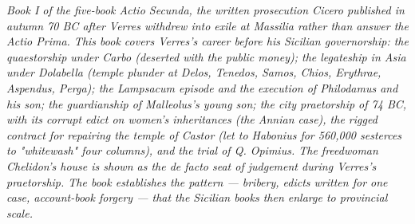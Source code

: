 
\textit{Book I of the five-book Actio Secunda, the written prosecution
Cicero published in autumn 70 BC after Verres withdrew into exile at
Massilia rather than answer the Actio Prima. This book covers Verres's
career before his Sicilian governorship: the quaestorship under Carbo
(deserted with the public money); the legateship in Asia under Dolabella
(temple plunder at Delos, Tenedos, Samos, Chios, Erythrae, Aspendus,
Perga); the Lampsacum episode and the execution of Philodamus and his
son; the guardianship of Malleolus's young son; the city praetorship
of 74 BC, with its corrupt edict on women's inheritances (the Annian
case), the rigged contract for repairing the temple of Castor (let to
Habonius for 560,000 sesterces to "whitewash" four columns), and the
trial of Q. Opimius. The freedwoman Chelidon's house is shown as the
de facto seat of judgement during Verres's praetorship. The book
establishes the pattern --- bribery, edicts written for one case,
account-book forgery --- that the Sicilian books then enlarge to
provincial scale.}
